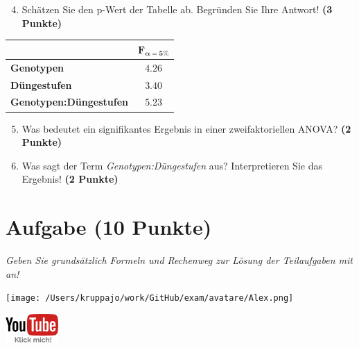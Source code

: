 \documentclass[a4paper, 9pt]{scrartcl}\usepackage[]{graphicx}\usepackage[]{xcolor}
\begin{document}
\vspace{1Ex}

\begin{enumerate}
  \setcounter{enumi}{3}
\item Schätzen Sie den p-Wert der Tabelle ab. Begründen Sie Ihre
  Antwort! \textbf{(3 Punkte)}
\end{enumerate}
  
\begin{center}
    \Large
\begin{tabular}{lc}
  \toprule
     & $\boldsymbol{F_{\alpha = 5\%}}$ \\
\midrule
  \textbf{Genotypen} & $4.26$ \\
  \textbf{Düngestufen} & $3.40$ \\
  \textbf{Genotypen:Düngestufen} & $5.23$ \\
  \bottomrule
  \end{tabular}
\end{center}

\begin{enumerate}
  \setcounter{enumi}{4}
\item Was bedeutet ein signifikantes Ergebnis in einer zweifaktoriellen ANOVA? \textbf{(2 Punkte)}
\item Was sagt der Term \textit{Genotypen:Düngestufen} aus? Interpretieren Sie das Ergebnis! \textbf{(2 Punkte)}
\end{enumerate}
 
\clearpage

\section{Aufgabe \hfill (10 Punkte)}

\textit{Geben Sie grundsätzlich Formeln und Rechenweg zur Lösung der Teilaufgaben mit an!} \\[1Ex]
 

 
\begin{minipage}[t]{0.5\textwidth}
\texttt{[image: /Users/kruppajo/work/GitHub/exam/avatare/Alex.png]}
\end{minipage}
\begin{minipage}[t]{0.5\textwidth}
\hfill
\href{https://youtu.be/rWTyHXXlYjY}{\includegraphics[width = 2cm]{img/youtube}}
\end{minipage}
\vspace{-3Ex}
\end{document}
